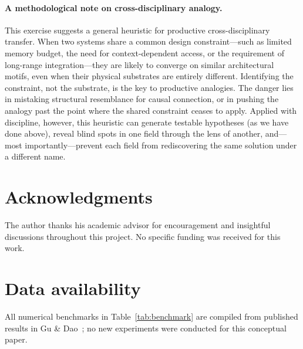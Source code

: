 \documentclass[12pt,a4paper]{article}
\begin{document}
\paragraph{A methodological note on cross-disciplinary analogy.}
This exercise suggests a general heuristic for productive cross-disciplinary transfer. When two systems share a common design constraint---such as limited memory budget, the need for context-dependent access, or the requirement of long-range integration---they are likely to converge on similar architectural motifs, even when their physical substrates are entirely different. Identifying the constraint, not the substrate, is the key to productive analogies. The danger lies in mistaking structural resemblance for causal connection, or in pushing the analogy past the point where the shared constraint ceases to apply. Applied with discipline, however, this heuristic can generate testable hypotheses (as we have done above), reveal blind spots in one field through the lens of another, and---most importantly---prevent each field from rediscovering the same solution under a different name.

\section*{Acknowledgments}

The author thanks his academic advisor for encouragement and insightful discussions throughout this project. No specific funding was received for this work.

\section*{Data availability}

All numerical benchmarks in Table~\ref{tab:benchmark} are compiled from published results in Gu \& Dao~\cite{gu2023mamba}; no new experiments were conducted for this conceptual paper.

\printbibliography
\end{document}
